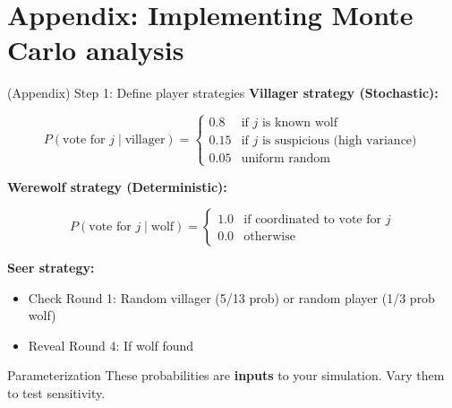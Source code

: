 \documentclass[10pt]{beamer}
\begin{document}
    

\section{Appendix: Implementing Monte Carlo analysis}

\begin{frame}{(Appendix) Step 1: Define player strategies}
  \textbf{Villager strategy (Stochastic):}
  
  $$P(\text{vote for } j \mid \text{villager}) = \begin{cases}
    0.8 & \text{if } j \text{ is known wolf} \\
    0.15 & \text{if } j \text{ is suspicious (high variance)} \\
    0.05 & \text{uniform random}
  \end{cases}$$

  \vspace{0.3cm}
  \textbf{Werewolf strategy (Deterministic):}
  
  $$P(\text{vote for } j \mid \text{wolf}) = \begin{cases}
    1.0 & \text{if coordinated to vote for } j \\
    0.0 & \text{otherwise}
  \end{cases}$$

  \vspace{0.3cm}
  \textbf{Seer strategy:}
  \begin{itemize}
    \item Check Round 1: Random villager (5/13 prob) or random player (1/3 prob wolf)
    \item Reveal Round 4: If wolf found
  \end{itemize}

  \begin{exampleblock}{Parameterization}
    These probabilities are \textbf{inputs} to your simulation. Vary them to test sensitivity.
  \end{exampleblock}
\end{frame}
\end{document}
